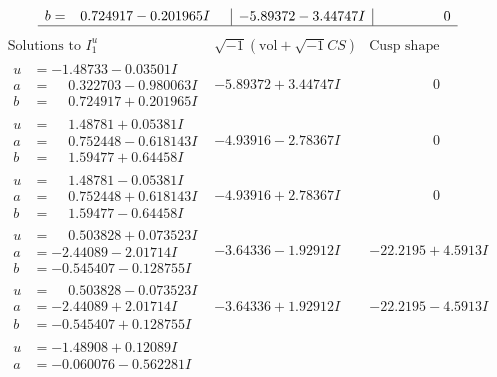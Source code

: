 \documentclass[1p]{elsarticle_modified}
\theoremstyle{definition}
\newcommand{\I}{\sqrt{-1}}
\begin{document}
$$\begin{array}{c|c|c}
\begin{aligned}
b &= \phantom{-}0.724917 - 0.201965 I\end{aligned}
 & -5.89372 - 3.44747 I & \phantom{-0.000000 } 0\\
 \hline 
 \end{array}$$\newpage$$\begin{array}{c|c|c}  
\text{Solutions to }I^u_{1}& \I (\text{vol} + \sqrt{-1}CS) & \text{Cusp shape}\\
 \hline 
\begin{aligned}
u &= -1.48733 - 0.03501 I \\
a &= \phantom{-}0.322703 - 0.980063 I \\
b &= \phantom{-}0.724917 + 0.201965 I\end{aligned}
 & -5.89372 + 3.44747 I & \phantom{-0.000000 } 0 \\ \hline\begin{aligned}
u &= \phantom{-}1.48781 + 0.05381 I \\
a &= \phantom{-}0.752448 - 0.618143 I \\
b &= \phantom{-}1.59477 + 0.64458 I\end{aligned}
 & -4.93916 - 2.78367 I & \phantom{-0.000000 } 0 \\ \hline\begin{aligned}
u &= \phantom{-}1.48781 - 0.05381 I \\
a &= \phantom{-}0.752448 + 0.618143 I \\
b &= \phantom{-}1.59477 - 0.64458 I\end{aligned}
 & -4.93916 + 2.78367 I & \phantom{-0.000000 } 0 \\ \hline\begin{aligned}
u &= \phantom{-}0.503828 + 0.073523 I \\
a &= -2.44089 - 2.01714 I \\
b &= -0.545407 - 0.128755 I\end{aligned}
 & -3.64336 - 1.92912 I & -22.2195 + 4.5913 I \\ \hline\begin{aligned}
u &= \phantom{-}0.503828 - 0.073523 I \\
a &= -2.44089 + 2.01714 I \\
b &= -0.545407 + 0.128755 I\end{aligned}
 & -3.64336 + 1.92912 I & -22.2195 - 4.5913 I \\ \hline\begin{aligned}
u &= -1.48908 + 0.12089 I \\
a &= -0.060076 - 0.562281 I \\

\end{aligned}
\end{array}$$
\end{document}
